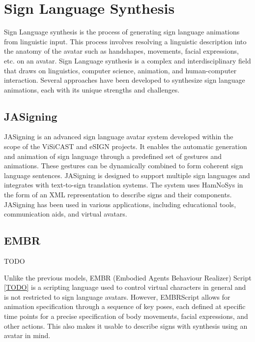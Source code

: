 

\section{Sign Language Synthesis}

Sign Language synthesis is the process of generating sign language animations from linguistic input. This process involves resolving a linguistic description into the anatomy of the avatar such as handshapes, movements, facial expressions, etc. on an avatar.  Sign Language synthesis is a complex and interdisciplinary field that draws on linguistics, computer science, animation, and human-computer interaction. Several approaches have been developed to synthesize sign language animations, each with its unique strengths and challenges.

\subsection{JASigning}

JASigning is an advanced sign language avatar system developed within the scope of the ViSiCAST and eSIGN projects\cite{TODO}. It enables the automatic generation and animation of sign language through a predefined set of gestures and animations. These gestures can be dynamically combined to form coherent sign language sentences. JASigning is designed to support multiple sign languages and integrates with text-to-sign translation systems. The system uses HamNoSys in the form of an XML representation\cite{TODO} to describe signs and their components. JASigning has been used in various applications, including educational tools, communication aids, and virtual avatars.


\subsection{EMBR}

TODO

Unlike the previous models, EMBR (Embodied Agents Behaviour Realizer) Script \ref{TODO} is a scripting language used to control virtual characters in general and is not restricted to sign language avatars. However, EMBRScript allows for animation specification through a sequence of key poses, each defined at specific time points for a precise specification of body movements, facial expressions, and other actions. This also makes it usable to describe signs with synthesis using an avatar in mind.

